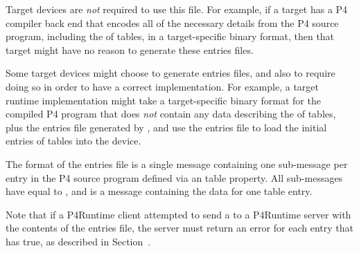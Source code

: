 \documentclass[11pt]{article}
\begin{document}
{%
Target devices are \emph{not} required to use this file.  For example, if a
target has a P4 compiler back end that encodes all of the necessary
details from the P4 source program, including the  of tables,
in a target-specific binary format, then that target might have no
reason to generate these entries files.%

Some target devices might choose to generate entries files, and also
to require doing so in order to have a correct implementation.  For
example, a target runtime implementation might take a target-specific
binary format for the compiled P4 program that does \emph{not} contain any
data describing the  of tables, plus the entries file
generated by , and use the entries file to load the initial
entries of tables into the device.%

The format of the entries file is a single  message
containing one  sub-message per entry in the P4 source program
defined via an  table property.  All  sub-messages
have  equal to , and  is a  message
containing the data for one table entry.%

Note that if a P4Runtime client attempted to send a  to
a P4Runtime server with the contents of the entries file, the server
must return an error for each entry that has  true, as
described in Section~.%

}
\end{document}
